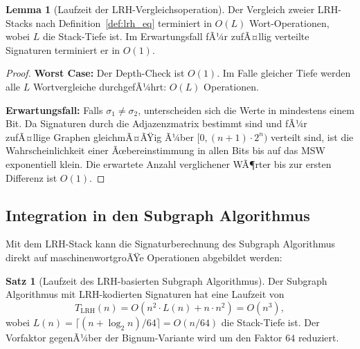 ﻿\documentclass[a4paper,12pt]{article}
\theoremstyle{definition}
\newtheorem{satz}{Satz}
\newtheorem{lemma}{Lemma}
\begin{document}
\begin{lemma}[Laufzeit der LRH-Vergleichsoperation]
\label{lem:lrh_vergleich_laufzeit}
Der Vergleich zweier LRH-Stacks nach Definition~\ref{def:lrh_eq} terminiert in
$O(L)$ Wort-Operationen, wobei $L$ die Stack-Tiefe ist.
Im Erwartungsfall fÃ¼r zufÃ¤llig verteilte Signaturen terminiert er in $O(1)$.
\end{lemma}

\begin{proof}
\textbf{Worst Case:} Der Depth-Check ist $O(1)$. Im Falle gleicher Tiefe werden
alle $L$ Wortvergleiche durchgefÃ¼hrt: $O(L)$ Operationen.

\textbf{Erwartungsfall:} Falls $\sigma_1 \neq \sigma_2$, unterscheiden sich die
Werte in mindestens einem Bit. Da Signaturen durch die Adjazenzmatrix bestimmt sind
und fÃ¼r zufÃ¤llige Graphen gleichmÃ¤ÃŸig Ã¼ber $[0, (n+1) \cdot 2^n)$ verteilt sind,
ist die Wahrscheinlichkeit einer Ãœbereinstimmung in allen Bits bis auf das MSW
exponentiell klein. Die erwartete Anzahl verglichener WÃ¶rter bis zur ersten
Differenz ist $O(1)$.
\end{proof}

\subsection{Integration in den Subgraph Algorithmus}

Mit dem LRH-Stack kann die Signaturberechnung des Subgraph Algorithmus direkt auf
maschinenwortgroÃŸe Operationen abgebildet werden:

\begin{satz}[Laufzeit des LRH-basierten Subgraph Algorithmus]
\label{satz:lrh_subgraph_laufzeit}
Der Subgraph Algorithmus mit LRH-kodier\-ten Signaturen hat eine Laufzeit von
\[
  T_{\mathrm{LRH}}(n) = O\!\left(n^2 \cdot L(n) + n \cdot n^2\right) = O(n^3),
\]
wobei $L(n) = \lceil (n + \log_2 n) / 64 \rceil = O(n/64)$ die Stack-Tiefe ist.
Der Vorfaktor gegenÃ¼ber der Bignum-Variante wird um den Faktor $64$ reduziert.
\end{satz}
\end{document}
